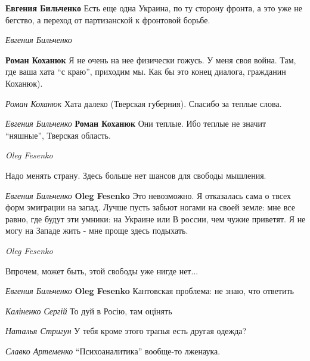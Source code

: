 \textbf{Евгения Бильченко} Есть еще одна Украина, по ту сторону фронта, а это
уже не бегство, а переход от партизанской к фронтовой борьбе.

\emph{Евгения Бильченко}

\textbf{Роман Коханюк} Я не очень на нее физически гожусь. У меня своя война.
Там, где ваша хата \enquote{с краю}, приходим мы. Как бы это конец диалога, гражданин
Коханюк).

\emph{Роман Коханюк}
Хата далеко (Тверская губерния). Спасибо за теплые слова.

\emph{Евгения Бильченко}
\textbf{Роман Коханюк} Они теплые. Ибо теплые не значит \enquote{няшные}, Тверская область.

\emph{Oleg Fesenko}

Надо менять страну.
Здесь больше нет шансов для свободы мышления.

\emph{Евгения Бильченко}
\textbf{Oleg Fesenko} Это невозможно. Я отказалась сама о твсех форм эмиграции
на запад.  Лучше пусть забьют ногами на своей земле: мне все равно, где будут
эти умники: на Украине или В россии, чем чужие приветят. Я не могу на Западе
жить - мне проще здесь подыхать.

\emph{Oleg Fesenko}

Впрочем, может быть, этой свободы уже нигде нет...

\emph{Евгения Бильченко}
\textbf{Oleg Fesenko} Кантовская проблема: не знаю, что ответить

\emph{Каліненко Сергій}
То дуй в Росію, там оцінять

\emph{Наталья Стригун}
У тебя кроме этого трапья есть другая одежда?

\emph{Славко Артеменко}
\enquote{Психоаналитика} вообще-то лженаука.

